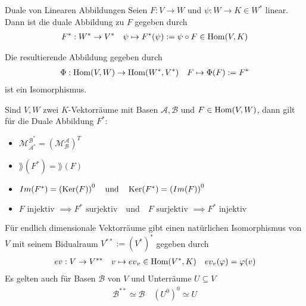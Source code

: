 \begin{definition}{Duale von Linearen Abbildungen}
    Seien $F: V \to W$ und $\psi: W \to K \in W^*$ linear. Dann ist die duale Abbildung zu $F$ gegeben durch
    \begin{align*}
        F^*: W^* \to V^* \quad \psi \mapsto F^{*}(\psi) := \psi \circ F \in \operatorname{Hom}(V, K)
    \end{align*}
    \begin{center}
    \end{center}
    Die resultierende Abbildung gegeben durch
    \begin{align*}
        \Phi: \operatorname{Hom}(V,W) \to \operatorname{Hom}(W^*, V^*) \quad F \mapsto \Phi(F) := F^* 
    \end{align*}
    ist ein Isomorphismus.
\end{definition}
Sind $V, W$ zwei $K$-Vektorräume mit Basen $\mathcal{A}, \mathcal{B}$ und $F \in \operatorname{Hom}(V,W)$, dann gilt für die Duale Abbildung $F^*$:

\begin{itemize}
    \item   $\mathcal{M}_{\mathcal{A}^*}^{\mathcal{B}^*} = \left(\mathcal{M}_{\mathcal{B}}^{\mathcal{A}}\right)^T$
    \item   $\rang(F^*) = \rang(F)$
    \item   $Im(F^*) = \left(\operatorname{Ker}(F)\right)^0 \quad \text{und} \quad \operatorname{Ker}(F^*) = \left(Im(F)\right)^0$
    \item   $F \text{ injektiv } \implies F^* \text{ surjektiv} \quad \text{und} \quad F \text{ surjektiv } \implies F^* \text{ injektiv}$
\end{itemize}


Für endlich dimensionale Vektorräume gibt einen natürlichen Isomorphismus von $V$ mit seinem Bidualraum $V^{**} := (V^*)^*$ gegeben durch
\begin{align*}
    ev: V \to  V^{**} \quad v \mapsto {ev}_v \in \operatorname{Hom}(V^*, K) \quad ev_v(\varphi) = \varphi(v)
\end{align*}
Es gelten auch für Basen $\mathcal{B}$ von $V$ und Unterräume $U \subseteq V$
\begin{align*}
    \mathcal{B}^{**} \simeq \mathcal{B} \quad (U^0)^0 \simeq U
\end{align*}

